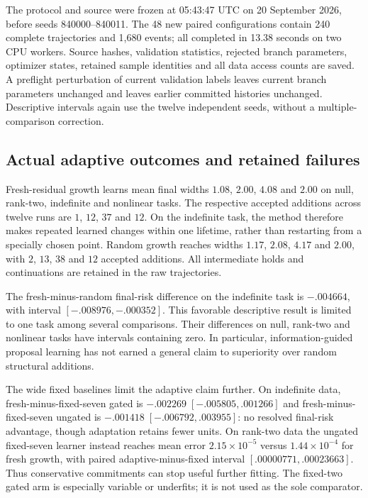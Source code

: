 The protocol and source were frozen at 05:43:47 UTC on 20 September 2026,
before seeds 840000--840011. The 48 new paired configurations contain 240
complete trajectories and 1,680 events; all completed in 13.38 seconds on two
CPU workers. Source hashes, validation statistics, rejected branch parameters,
optimizer states, retained sample identities and all data access counts are
saved. A preflight perturbation of current validation labels leaves current
branch parameters unchanged and leaves earlier committed histories unchanged.
Descriptive intervals again use the twelve independent seeds, without a
multiple-comparison correction.

\subsection{Actual adaptive outcomes and retained failures}
\begin{table}[tb]
\centering\scriptsize

\caption{Separate adaptive extension: mean final MSE, followed by mean
committed width in parentheses. All results use new seeds; they are not paired
with the main study's seeds. Full marginal and paired intervals are saved.}
\label{tab:adaptive-results}
\end{table}

Fresh-residual growth learns mean final widths $1.08$, $2.00$, $4.08$ and
$2.00$ on null, rank-two, indefinite and nonlinear tasks. The respective
accepted additions across twelve runs are $1$, $12$, $37$ and $12$.
On the indefinite task, the method therefore makes repeated learned changes
within one lifetime, rather than restarting from a specially chosen point.
Random growth reaches widths $1.17$, $2.08$, $4.17$ and $2.00$, with
$2$, $13$, $38$ and $12$ accepted additions. All intermediate holds and
continuations are retained in the raw trajectories.

The fresh-minus-random final-risk difference on the indefinite task is
$-.004664$, with interval $[-.008976,-.000352]$. This favorable descriptive result is
limited to one task among several comparisons. Their differences on null,
rank-two and nonlinear tasks have intervals containing zero. In particular,
information-guided proposal learning has not earned a general claim to
superiority over random structural additions.

The wide fixed baselines limit the adaptive claim further. On indefinite
data, fresh-minus-fixed-seven gated is
$-.002269\;[-.005805,.001266]$ and fresh-minus-fixed-seven ungated is
$-.001418\;[-.006792,.003955]$: no resolved final-risk advantage, though
adaptation retains fewer units. On rank-two data the ungated fixed-seven
learner instead reaches mean error $2.15\times10^{-5}$ versus
$1.44\times10^{-4}$ for fresh growth, with paired adaptive-minus-fixed
interval $[.00000771,.00023663]$. Thus conservative commitments can stop
useful further fitting. The fixed-two gated arm is especially variable or
underfits; it is not used as the sole comparator.

